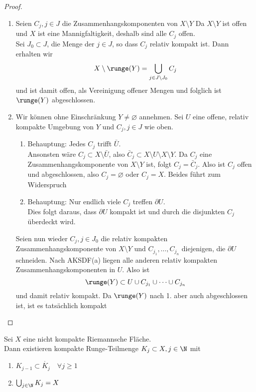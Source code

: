 \begin{proof}
  \begin{enumerate}
  \item Seien $C_j, j \in J$ die Zusammenhangskomponenten von $X
    \setminus Y$ Da $X \setminus Y$ ist offen und $X$ ist eine
    Mannigfaltigkeit, deshalb sind alle $C_j$ offen. \\
    Sei $J_0 \subset J$, die Menge der $j \in J$, so dass $C_j$
    relativ kompakt ist. Dann erhalten wir
    \[
    X \setminus \runge(Y) = \bigcup_{j \in J\setminus J_0} C_j
    \]
    und ist damit offen, als Vereinigung offener Mengen und folglich
    ist $\runge(Y)$ abgeschlossen.
  \item Wir können ohne Einschränkung $Y \neq \varnothing$
    annehmen. Sei $U$ eine offene, relativ kompakte Umgebung von $Y$
    und $C_j, j\in J$ wie oben.
    \begin{enumerate}
    \item Behauptung: Jedes $C_j$ trifft $\bar U$. \\
      Ansonsten wäre $C_j \subset X \setminus \bar U$, also $\bar C_j
      \subset X \setminus U \setminus X \setminus Y$. Da $C_j$ eine
      Zusammenhangskomponente von $X \setminus Y$ ist, folgt $C_j =
      \bar C_j$. Also ist $C_j$ offen und abgeschlossen, also $C_j =
      \varnothing$ oder $C_j = X$. Beides führt zum Widerspruch
    \item Behauptung: Nur endlich viele $C_j$ treffen $\partial U$. \\
      Dies folgt daraus, dass $\partial U$ kompakt ist und durch die
      disjunkten $C_j$ überdeckt wird.
    \end{enumerate}
    Seien nun wieder $C_j, j \in J_0$ die relativ kompakten
    Zusammenhangskomponente von $X \setminus Y$ und $C_{j_1}, \dots,
    C_{j_n}$ diejenigen, die $\partial U$ schneiden. Nach AKSDF(a)
    liegen alle anderen relativ kompakten Zusammenhangskomponenten in
    $U$. Also ist
    \[
    \runge(Y) \subset U \cup C_{j_1} \cup \dots \cup C_{j_n}
    \]
    und damit relativ kompakt. Da $\runge(Y)$ nach 1. aber auch
    abgeschlossen ist, ist es tatsächlich kompakt
  \end{enumerate}
\end{proof}

\begin{cor}
  \label{cor:ausschöpfung-kompakt}
  Sei $X$ eine nicht kompakte Riemannsche Fläche. \\
  Dann existieren kompakte Runge-Teilmenge $K_j \subset X, j \in \N$ mit
  \begin{enumerate}
  \item $K_{j-1} \subset \mathring{K_j} \quad \forall j \geq 1$
  \item $\bigcup_{j\in \N} K_j = X$
  \end{enumerate}
\end{cor}

